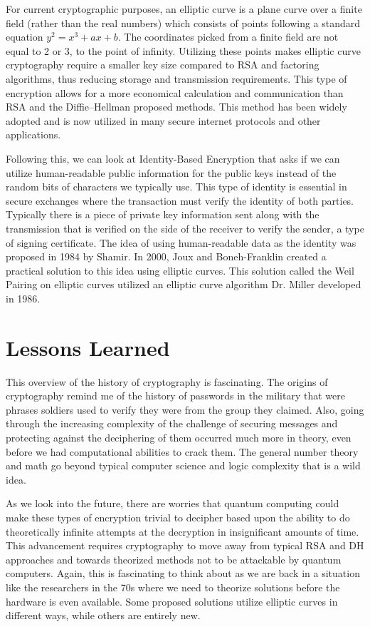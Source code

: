 \documentclass[journal,onecolumn]{IEEEtran}
\begin{document}
For current cryptographic purposes, an elliptic curve is a plane curve over a finite field (rather than the real numbers) which consists of points following a standard equation $y^2 = x^3 + ax + b$. The coordinates picked from a finite field are not equal to 2 or 3, to the point of infinity. Utilizing these points makes elliptic curve cryptography require a smaller key size compared to RSA and factoring algorithms, thus reducing storage and transmission requirements.
This type of encryption allows for a more economical calculation and communication than RSA and the Diffie–Hellman proposed methods. This method has been widely adopted and is now utilized in many secure internet protocols and other applications. 

Following this, we can look at Identity-Based Encryption that asks if we can utilize human-readable public information for the public keys instead of the random bits of characters we typically use. This type of identity is essential in secure exchanges where the transaction must verify the identity of both parties. Typically there is a piece of private key information sent along with the transmission that is verified on the side of the receiver to verify the sender, a type of signing certificate.  The idea of using human-readable data as the identity was proposed in 1984 by Shamir. In 2000, Joux and Boneh-Franklin created a practical solution to this idea using elliptic curves. This solution called the Weil Pairing on elliptic curves utilized an elliptic curve algorithm Dr. Miller developed in 1986.

\section{Lessons Learned}

This overview of the history of cryptography is fascinating. The origins of cryptography remind me of the history of passwords in the military that were phrases soldiers used to verify they were from the group they claimed. Also, going through the increasing complexity of the challenge of securing messages and protecting against the deciphering of them occurred much more in theory, even before we had computational abilities to crack them. The general number theory and math go beyond typical computer science and logic complexity that is a wild idea. 

As we look into the future, there are worries that quantum computing could make these types of encryption trivial to decipher based upon the ability to do theoretically infinite attempts at the decryption in insignificant amounts of time. This advancement requires cryptography to move away from typical RSA and DH approaches and towards theorized methods not to be attackable by quantum computers. Again, this is fascinating to think about as we are back in a situation like the researchers in the 70s where we need to theorize solutions before the hardware is even available. Some proposed solutions utilize elliptic curves in different ways, while others are entirely new. 
\end{document}
